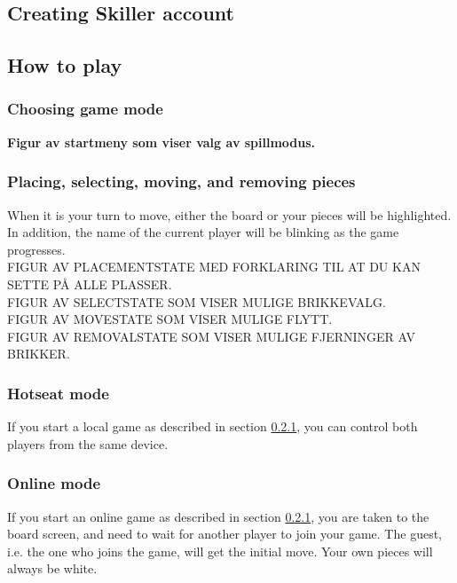 \subsection{Creating Skiller account}

\subsection{How to play}

\subsubsection{Choosing game mode}
\label{section:game_mode}

{\bf Figur av startmeny som viser valg av spillmodus.} \\

\subsubsection{Placing, selecting, moving, and removing pieces}
When it is your turn to move, either the board or your pieces will be highlighted. In addition, the name of the current player will be blinking as the game progresses. \\

FIGUR AV PLACEMENTSTATE MED FORKLARING TIL AT DU KAN SETTE PÅ ALLE PLASSER. \\

FIGUR AV SELECTSTATE SOM VISER MULIGE BRIKKEVALG. \\

FIGUR AV MOVESTATE SOM VISER MULIGE FLYTT. \\

FIGUR AV REMOVALSTATE SOM VISER MULIGE FJERNINGER AV BRIKKER. \\

\subsubsection{Hotseat mode}

If you start a local game as described in section \ref{section:game_mode}, you can control both players from the same device.

\subsubsection{Online mode}

If you start an online game as described in section \ref{section:game_mode}, you are taken to the board screen, and need to wait for another player to join your game. The guest, i.e. the one who joins the game, will get the initial move. Your own pieces will always be white.






